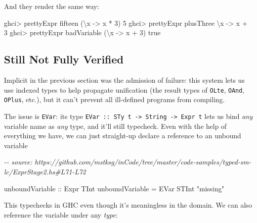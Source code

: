 \documentclass[]{article}
\newenvironment{Shaded}{}{}
\newcommand{\CommentTok}[1]{\textcolor[rgb]{0.38,0.63,0.69}{\textit{#1}}}
\newcommand{\DataTypeTok}[1]{\textcolor[rgb]{0.56,0.13,0.00}{#1}}
\newcommand{\DecValTok}[1]{\textcolor[rgb]{0.25,0.63,0.44}{#1}}
\newcommand{\NormalTok}[1]{#1}
\newcommand{\OperatorTok}[1]{\textcolor[rgb]{0.40,0.40,0.40}{#1}}
\newcommand{\OtherTok}[1]{\textcolor[rgb]{0.00,0.44,0.13}{#1}}
\newcommand{\StringTok}[1]{\textcolor[rgb]{0.25,0.44,0.63}{#1}}
\begin{document}
And they render the same way:

\begin{Shaded}
\begin{Highlighting}[]
\NormalTok{ghci}\OperatorTok{\textgreater{}}\NormalTok{ prettyExpr fifteen}
\NormalTok{(\textbackslash{}x }\OtherTok{{-}\textgreater{}}\NormalTok{ x }\OperatorTok{*} \DecValTok{3}\NormalTok{) }\DecValTok{5}
\NormalTok{ghci}\OperatorTok{\textgreater{}}\NormalTok{ prettyExpr plusThree}
\NormalTok{\textbackslash{}x }\OtherTok{{-}\textgreater{}}\NormalTok{ x }\OperatorTok{+} \DecValTok{3}
\NormalTok{ghci}\OperatorTok{\textgreater{}}\NormalTok{ prettyExpr badVariable}
\NormalTok{(\textbackslash{}x }\OtherTok{{-}\textgreater{}}\NormalTok{ x }\OperatorTok{+} \DecValTok{3}\NormalTok{) true}
\end{Highlighting}
\end{Shaded}

\subsection{Still Not Fully Verified}\label{still-not-fully-verified}

Implicit in the previous section was the admission of failure: this system lets
us use indexed types to help propagate unification (the result types of
\texttt{OLte}, \texttt{OAnd}, \texttt{OPlus}, etc.), but it can't prevent all
ill-defined programs from compiling.

The issue is \texttt{EVar}: its type
\texttt{EVar\ ::\ STy\ t\ -\textgreater{}\ String\ -\textgreater{}\ Expr\ t}
lets us bind \emph{any} variable name as \emph{any} type, and it'll still
typecheck. Even with the help of everything we have, we can just straight-up
declare a reference to an unbound variable

\begin{Shaded}
\begin{Highlighting}[]
\CommentTok{{-}{-} source: https://github.com/mstksg/inCode/tree/master/code{-}samples/typed{-}sm{-}lc/ExprStage2.hs\#L71{-}L72}

\OtherTok{unboundVariable ::} \DataTypeTok{Expr} \DataTypeTok{TInt}
\NormalTok{unboundVariable }\OtherTok{=} \DataTypeTok{EVar} \DataTypeTok{STInt} \StringTok{"missing"}
\end{Highlighting}
\end{Shaded}

This typechecks in GHC even though it's meaningless in the domain. We can also
reference the variable under any \emph{type}:
\end{document}
